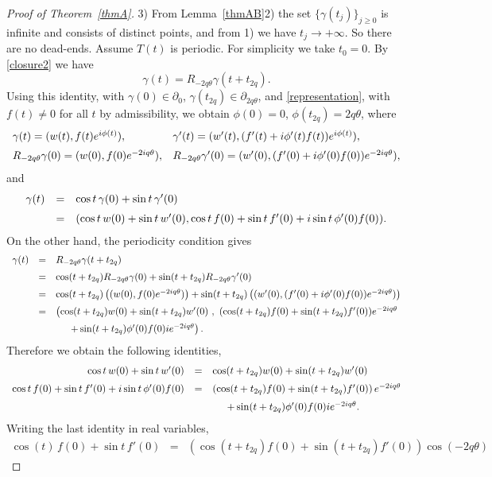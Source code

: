 \documentclass[11pt,a4paper,times]{amsart}
\theoremstyle{plain}
\theoremstyle{definition}
\numberwithin{equation}{section}
\newcommand{\eqskip}{ \vspace*{2mm}\\ }
\begin{document}
\begin{proof}[Proof of Theorem~\ref{thmA}]
3) From Lemma~\ref{thmAB}{\rm 2)} the set $\{\gamma(t_j)\}_{j\ge0}$ is infinite and consists of distinct points, and from 1) we have $t_j\to +\infty$.
So there are no dead-ends. Assume $T(t)$ is periodic. For simplicity we take $t_0=0$.
By \eqref{closure2} we have
\[
\gamma(t)=R_{-2q\theta}\gamma(t+t_{2q}).
\]
Using this identity, with $\gamma(0)\in \partial_0$, $\gamma(t_{2q})\in \partial_{2q\theta}$, and \eqref{representation}, with $f(t)\neq 0$ for all $t$ by admissibility,  we obtain $\phi(0)=0$, $\phi(t_{2q})=2q\theta$,  where
\[
\begin{array}{ll}
\gamma(t)=(w(t),f(t)e^{i\phi(t)}), &
\gamma'(t)=(w'(t), (f'(t)+i\phi'(t)f(t))e^{i\phi(t)}),\eqskip
R_{-2q\theta}\gamma(0)= (w(0),f(0)e^{-2iq\theta}),&
R_{-2q\theta}\gamma'(0)= (w'(0),(f'(0)+i\phi'(0)f(0))e^{-2iq\theta}),
\end{array}
\]
and
\[
\begin{array}{lll}
\gamma(t) & = & \cos t \,\gamma(0) + \sin t\,\gamma'(0)\eqskip
& = & (\cos t\, w(0)+ \sin t\, w'(0), \cos t\, f(0)+\sin t\, f'(0)+ i\sin t\, \phi'(0)f(0)).
\end{array}
\]
On the other hand, the periodicity condition gives
\[
\begin{array}{lll}
\gamma(t)&=&  R_{-2q\theta}\gamma(t+t_{2q})\eqskip
&=& \cos (t+t_{2q}) R_{-2q\theta}\gamma(0)+ \sin (t+t_{2q})R_{-2q\theta}\gamma'(0)\eqskip
&=& \cos (t+t_{2q})\left( (w(0),f(0)e^{-2iq\theta})\right)+ \sin (t+t_{2q})\left((w'(0),(f'(0)+i\phi'(0)f(0))e^{-2iq\theta})\right)\eqskip
&=& \left( \cos (t+t_{2q})w(0)+ \sin (t+t_{2q})w'(0)~,~ (\cos (t+t_{2q})f(0)
+ \sin (t+t_{2q}) f'(0))e^{-2iq\theta} \right.\eqskip
&& \hspace*{5mm} \left.+\sin(t+t_{2q})\phi'(0)f(0)ie^{-2iq\theta}\right).
\end{array}
\]
Therefore we obtain the following identities,
\[
\begin{array}{rcl}
\label{c}
\cos t\, w(0)+ \sin t\, w'(0) & = &
 \cos (t+t_{2q})w(0)+ \sin (t+t_{2q})w'(0)\eqskip
 \cos t\, f(0)+\sin t\, f'(0)+ i\sin t\, \phi'(0)f(0)
 & = & \left(\cos (t+t_{2q}) f(0)+
\sin (t+t_{2q}) f'(0)\right)e^{-2iq\theta}\nonumber \eqskip
& &\hspace*{5mm}+\sin(t+t_{2q})\phi'(0)f(0)ie^{-2iq\theta}.\nonumber
\end{array}
\]
Writing the last identity in real variables,
\begin{equation}\label{d}
 \begin{array}{rcl}
\cos(t)\, f(0)+\sin t\, f'(0) & = & (\cos (t+t_{2q}) f(0)+ \sin (t+t_{2q}) f'(0))\cos(-2q\theta)

\end{array}
\end{equation}
\end{proof}
\end{document}
